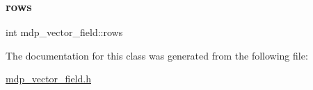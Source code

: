 \mbox{\label{classmdp__vector__field_ace0dc78c30bf473dab2014dac9b56d1d}} 
\subsubsection{\texorpdfstring{rows}{rows}}
{\footnotesize\ttfamily int mdp\+\_\+vector\+\_\+field\+::rows}



The documentation for this class was generated from the following file\+:\begin{DoxyCompactItemize}
\item 
\hyperlink{mdp__vector__field_8h}{mdp\+\_\+vector\+\_\+field.\+h}\end{DoxyCompactItemize}
